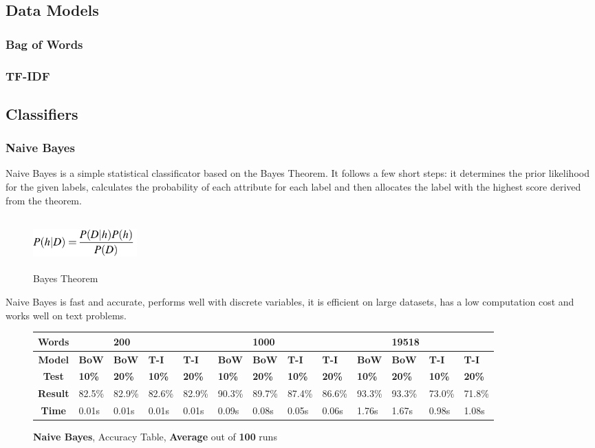 \documentclass{article}
\begin{document}
	\subsection{Data Models}
	\subsubsection{Bag of Words}
	\subsubsection{TF-IDF}
	
	
	\subsection{Classifiers}
	\subsubsection{Naive Bayes}
	\par Naive Bayes is a simple statistical classificator based on the Bayes Theorem. It follows a few short steps: it determines the prior likelihood for the given labels, calculates the probability of each attribute for each label and then allocates the label with the highest score derived from the theorem. 
	\begin{figure}[!h]
		\centering
		\includegraphics[width=4cm,height=2cm,keepaspectratio]{Pics/NaiveBayes}
		\caption{Bayes Theorem}
	\end{figure}
	\par Naive Bayes is fast and accurate, performs well with discrete variables, it is efficient on large datasets, has a low computation cost and works well on text problems.
	\begin{figure}[!h]
		\begin{tabular}{||c||l|l|l|l||l|l|l|l||l|l|l|l||}
			\hline
			\textbf{Words} &  & \textbf{200} & & & &\textbf{1000} & & & & \textbf{19518} &  & \\ \hline 
			\textbf{Model} & \textbf{BoW} & \textbf{BoW} & \textbf{T-I} & \textbf{T-I} &\textbf{BoW} & \textbf{BoW} & \textbf{T-I} & \textbf{T-I} & \textbf{BoW} & \textbf{BoW} & \textbf{T-I} & \textbf{T-I}\\ \hline
			\textbf{Test} & \textbf{10\%} & \textbf{20\%} & \textbf{10\%} & \textbf{20\%} & \textbf{10\%} & \textbf{20\%} & \textbf{10\%} & \textbf{20\%} & \textbf{10\%} & \textbf{20\%} & \textbf{10\%} & \textbf{20\%} \\ \hline \hline  
			\textbf{Result} & 82.5\% & 82.9\% & 82.6\% & 82.9\% & 90.3\% & 89.7\% & 87.4\% & 86.6\% & 93.3\% & 93.3\% & 73.0\% & 71.8\% \\ \hline 
			\textbf{Time} & 0.01s & 0.01s & 0.01s & 0.01s & 0.09s & 0.08s & 0.05s & 0.06s & 1.76s & 1.67s & 0.98s & 1.08s \\ \hline 
		\end{tabular}
		\caption{\textbf{Naive Bayes}, Accuracy Table, \textbf{Average} out of \textbf{100} runs}
	\end{figure}
\end{document}
